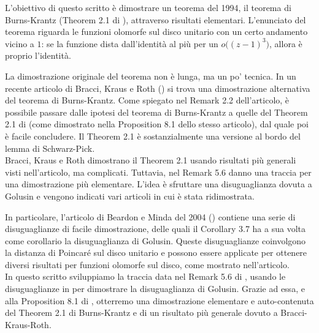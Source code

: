 L'obiettivo di questo scritto è dimostrare un teorema del 1994, il teorema di Burns-Krantz (Theorem 2.1 di \cite{BK}), attraverso risultati elementari. L'enunciato del teorema riguarda le funzioni olomorfe sul disco unitario con un certo andamento vicino a $1$: se la funzione dista dall'identità al più per un $o\bigl((z-1)^3\bigr)$, allora è proprio l'identità.

La dimostrazione originale del teorema non è lunga, ma un po' tecnica. In un recente articolo di Bracci, Kraus e Roth (\cite{BKR}) si trova una dimostrazione alternativa del teorema di Burns-Krantz. Come spiegato nel Remark 2.2 dell'articolo, è possibile passare dalle ipotesi del teorema di Burns-Krantz a quelle del Theorem 2.1 di \cite{BKR} (come dimostrato nella Proposition 8.1 dello stesso articolo), dal quale poi è facile concludere. Il Theorem 2.1 è sostanzialmente una versione al bordo del lemma di Schwarz-Pick. \\

Bracci, Kraus e Roth dimostrano il Theorem 2.1 usando risultati più generali visti nell'articolo, ma complicati. Tuttavia, nel Remark 5.6 danno una traccia per una dimostrazione più elementare. L'idea è sfruttare una disuguaglianza dovuta a Golusin e vengono indicati vari articoli in cui è stata ridimostrata.

In particolare, l'articolo di Beardon e Minda del 2004 (\cite{BM}) contiene una serie di disuguaglianze di facile dimostrazione, delle quali il Corollary 3.7 ha a sua volta come corollario la disuguaglianza di Golusin. Queste disuguaglianze coinvolgono la distanza di Poincaré sul disco unitario e possono essere applicate per ottenere diversi risultati per funzioni olomorfe sul disco, come mostrato nell'articolo. \\

In questo scritto sviluppiamo la traccia data nel Remark 5.6 di \cite{BKR}, usando le disuguaglianze in \cite{BM} per dimostrare la disuguaglianza di Golusin. Grazie ad essa, e alla Proposition 8.1 di \cite{BKR}, otterremo una dimostrazione elementare e auto-contenuta del Theorem 2.1 di Burns-Krantz e di un risultato più generale dovuto a Bracci-Kraus-Roth.

